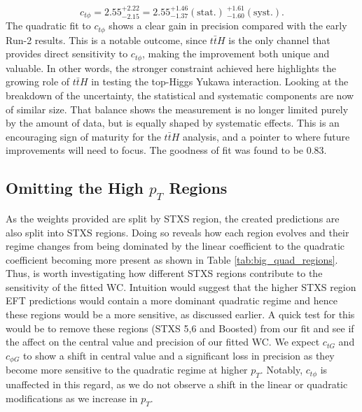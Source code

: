 \begin{equation}
    c_{t\phi} = 2.55^{+2.22}_{-2.15}=2.55^{+1.46}_{-1.37} (\text{stat.})~^{+1.61}_{-1.60} (\text{syst.}). 
\end{equation}
The quadratic fit to $c_{t\phi}$ shows a clear gain in precision compared with the early Run-2 results. This is a notable outcome, since $t\bar{t}H$ is the only channel that provides direct sensitivity to $c_{t\phi}$, making the improvement both unique and valuable. In other words, the stronger constraint achieved here highlights the growing role of $t\bar{t}H$ in testing the top-Higgs Yukawa interaction. Looking at the breakdown of the uncertainty, the statistical and systematic components are now of similar size. That balance shows the measurement is no longer limited purely by the amount of data, but is equally shaped by systematic effects. This is an encouraging sign of maturity for the $t\bar{t}H$ analysis, and a pointer to where future improvements will need to focus. The goodness of fit was found to be 0.83.
\subsection{Omitting the High $p_T$ Regions}
As the weights provided are split by STXS region, the created predictions are also split into STXS regions. Doing so reveals how each region evolves and their regime changes from being dominated by the linear coefficient to the quadratic coefficient becoming more present as shown in Table \ref{tab:big_quad_regions}. Thus, is worth investigating how different STXS regions contribute to the sensitivity of the fitted WC. Intuition would suggest that the higher STXS region EFT predictions would contain a more dominant quadratic regime and hence these regions would be a more sensitive, as discussed earlier. A quick test for this would be to remove these regions (STXS 5,6 and Boosted) from our fit and see if the affect on the central value and precision of our fitted WC. We expect $c_{tG}$ and $c_{\phi G}$ to show a shift in central value and a significant loss in precision as they become more sensitive to the quadratic regime at higher $p_T$. Notably, $c_{t\phi}$ is unaffected in this regard, as we do not observe a shift in the linear or quadratic modifications as we increase in $p_T$. 
    \begin{table}[h!]
        \centering
        
    \end{table}




